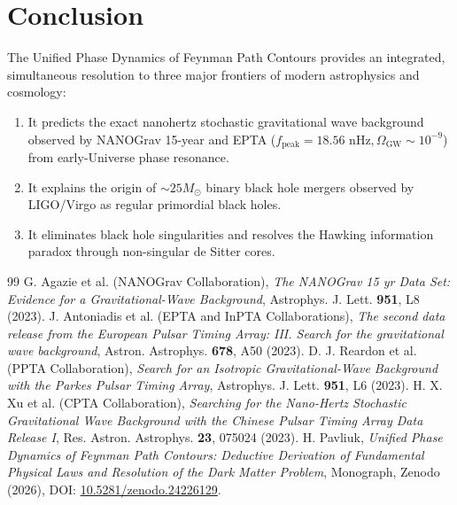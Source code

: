 \documentclass[11pt,a4paper]{article}
\begin{document}
\section{Conclusion}

The Unified Phase Dynamics of Feynman Path Contours provides an integrated, simultaneous resolution to three major frontiers of modern astrophysics and cosmology:
\begin{enumerate}
    \item It predicts the exact nanohertz stochastic gravitational wave background observed by NANOGrav 15-year and EPTA ($f_{\mathrm{peak}} = 18.56\text{ nHz}, \Omega_{\mathrm{GW}} \sim 10^{-9}$) from early-Universe phase resonance.
    \item It explains the origin of $\sim 25 M_\odot$ binary black hole mergers observed by LIGO/Virgo as regular primordial black holes.
    \item It eliminates black hole singularities and resolves the Hawking information paradox through non-singular de Sitter cores.
\end{enumerate}

\begin{thebibliography}{99}
 G. Agazie et al. (NANOGrav Collaboration), \textit{The NANOGrav 15 yr Data Set: Evidence for a Gravitational-Wave Background}, Astrophys. J. Lett. \textbf{951}, L8 (2023).
 J. Antoniadis et al. (EPTA and InPTA Collaborations), \textit{The second data release from the European Pulsar Timing Array: III. Search for the gravitational wave background}, Astron. Astrophys. \textbf{678}, A50 (2023).
 D. J. Reardon et al. (PPTA Collaboration), \textit{Search for an Isotropic Gravitational-Wave Background with the Parkes Pulsar Timing Array}, Astrophys. J. Lett. \textbf{951}, L6 (2023).
 H. X. Xu et al. (CPTA Collaboration), \textit{Searching for the Nano-Hertz Stochastic Gravitational Wave Background with the Chinese Pulsar Timing Array Data Release I}, Res. Astron. Astrophys. \textbf{23}, 075024 (2023).
 H. Pavliuk, \textit{Unified Phase Dynamics of Feynman Path Contours: Deductive Derivation of Fundamental Physical Laws and Resolution of the Dark Matter Problem}, Monograph, Zenodo (2026), DOI: \href{https://doi.org/10.5281/zenodo.24226129}{10.5281/zenodo.24226129}.
\end{thebibliography}
\end{document}
